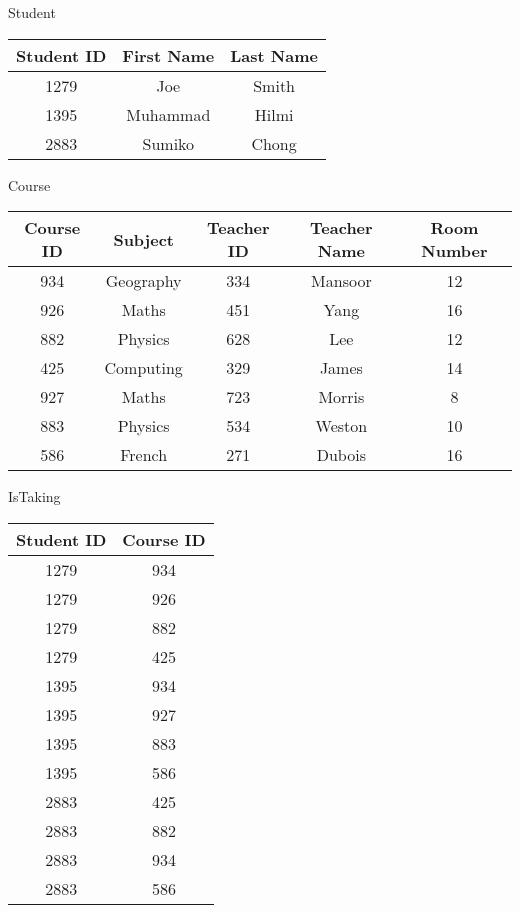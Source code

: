 Student

\begin{tabular}{|c|c|c|}
\hline 
\textbf{Student ID} & \textbf{First Name} & \textbf{Last Name}\tabularnewline
\hline 
\hline 
1279 & Joe & Smith\tabularnewline
\hline 
1395 & Muhammad & Hilmi\tabularnewline
\hline 
2883 & Sumiko & Chong\tabularnewline
\hline 
\end{tabular}

Course

\begin{tabular}{|c|c|c|c|c|}
\hline 
\textbf{Course ID} & \textbf{Subject} & \textbf{Teacher ID} & \textbf{Teacher Name} & \textbf{Room Number}\tabularnewline
\hline 
\hline 
934 & Geography & 334 & Mansoor & 12\tabularnewline
\hline 
926 & Maths & 451 & Yang & 16\tabularnewline
\hline 
882 & Physics & 628 & Lee & 12\tabularnewline
\hline 
425 & Computing & 329 & James & 14\tabularnewline
\hline 
927 & Maths & 723 & Morris & 8\tabularnewline
\hline 
883 & Physics & 534 & Weston & 10\tabularnewline
\hline 
586 & French & 271 & Dubois & 16\tabularnewline
\hline 
\end{tabular}

IsTaking

\begin{tabular}{|c|c|}
\hline 
\textbf{Student ID} & \textbf{Course ID}\tabularnewline
\hline 
\hline 
1279 & 934\tabularnewline
\hline 
1279 & 926\tabularnewline
\hline 
1279 & 882\tabularnewline
\hline 
1279 & 425\tabularnewline
\hline 
1395 & 934\tabularnewline
\hline 
1395 & 927\tabularnewline
\hline 
1395 & 883\tabularnewline
\hline 
1395 & 586\tabularnewline
\hline 
2883 & 425\tabularnewline
\hline 
2883 & 882\tabularnewline
\hline 
2883 & 934\tabularnewline
\hline 
2883 & 586\tabularnewline
\hline 
\end{tabular}

